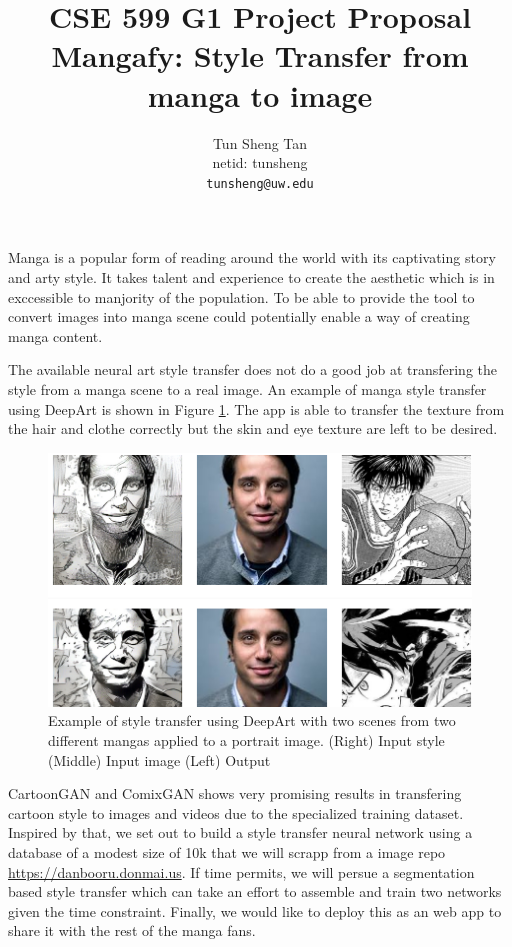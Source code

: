 \documentclass{article}
\title{CSE 599 G1 Project Proposal\\Mangafy: Style Transfer from manga to image}
\author{%
Tun Sheng Tan\\
netid: tunsheng\\
\texttt{tunsheng@uw.edu}
}
\begin{document}
\maketitle

Manga is a popular form of reading around the world with its captivating story and arty style. It takes talent and experience to create the aesthetic which is in exccessible to manjority of the population. To be able to provide the tool to convert images into manga scene could potentially enable a way of creating manga content.

  The available neural art style transfer does not do a good job at transfering the style from a manga scene to a real image. An example of manga style transfer using DeepArt \cite{deepart} is shown in Figure \ref{fig:deepart}. The app is able to transfer the texture from the hair and clothe correctly but the skin and eye texture are left to be desired.

\begin{figure}[b]
  \includegraphics[width=\textwidth]{figure/deepart.png}
  \caption{Example of style transfer using DeepArt with two scenes from two different mangas \cite{deepart} applied to a portrait image. (Right) Input style (Middle) Input image (Left) Output}
  \label{fig:deepart}
\end{figure}

CartoonGAN \cite{CartoonGAN} and ComixGAN \cite{ComixGAN} shows very promising results in transfering cartoon style to images and videos due to the specialized training dataset. Inspired by that, we set out to build a style transfer neural network using a database of a modest size of 10k that we will scrapp from a image repo \url{https://danbooru.donmai.us}. If time permits, we will persue a segmentation based style transfer which can take an effort to assemble and train two networks given the time constraint. Finally, we would like to deploy this as an web app to share it with the rest of the manga fans.
\end{document}
